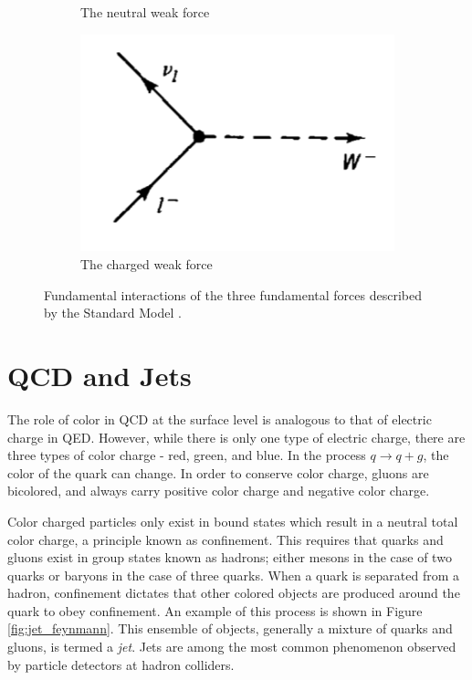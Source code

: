 \begin{figure}
\begin{subfigure}[b]{0.4\textwidth}
         \caption{The neutral weak force}
     \end{subfigure}
     \hfill  
     \begin{subfigure}[b]{0.4\textwidth}
         \centering
         \includegraphics[width=\textwidth]{figures/ch1/weak_charged.png}
         \caption{The charged weak force}
     \end{subfigure} 
     \caption{Fundamental interactions of the three fundamental forces described by the Standard Model \cite{griffiths}. }
     \label{fig:force_feynmann}
\end{figure}

\section{QCD and Jets}
\label{sec:QCD}
The role of color in QCD at the surface level is analogous to that of electric charge in QED. However, while there is only one type of electric charge, there are three types of color charge - red, green, and blue. In the process $q \rightarrow q+g$, the color of the quark can change. In order to conserve color charge, gluons are bicolored, and always carry positive color charge and negative color charge. \par
Color charged particles only exist in bound states which result in a neutral total color charge, a principle known as confinement. This requires that quarks and gluons exist in group states known as hadrons; either mesons in the case of two quarks or baryons in the case of three quarks. When a quark is separated from a hadron, confinement dictates that other colored objects are produced around the quark to obey confinement. An example of this process is shown in Figure \ref{fig:jet_feynmann}. This ensemble of objects, generally a mixture of quarks and gluons, is termed a \textit{jet}. Jets are among the most common phenomenon observed by particle detectors at hadron colliders.

